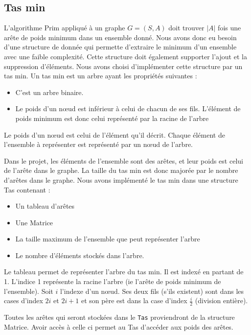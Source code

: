\documentclass[a4paper,11pt]{article}
\begin{document}
\subsection{Tas min} %
L'algorithme Prim appliqué à un graphe $G = (S, A)$ doit trouver $|A|$ fois une arête de poids minimum dans un ensemble donné.
Nous avons donc eu besoin d'une structure de donnée qui permette d'extraire le minimum d'un ensemble avec une faible complexité. Cette structure doit également supporter l'ajout et la suppression d'éléments.
Nous avons choisi d'implémenter cette structure par un tas min.
Un tas min est un arbre ayant les propriétés suivantes :
\begin{itemize}
\item C'est un arbre binaire.
\item Le poids d'un nœud est inférieur à celui de chacun de ses fils. L'élément de poids minimum est donc celui représenté par la racine de l'arbre
\end{itemize}
Le poids d'un nœud est celui de l'élément qu'il décrit.
Chaque élément de l'ensemble à représenter est représenté par un nœud de l'arbre.

Dans le projet, les éléments de l'ensemble sont des arêtes, et leur poids est celui de l'arête dans le graphe. La taille du tas min est donc majorée par le nombre d'arêtes dans le graphe.
Nous avons implémenté le tas min dans une structure \textsf{Tas} contenant :
\begin{itemize}
\renewcommand{\FrenchLabelItem}{\textbullet}
\item Un tableau d’arêtes
\item Une \textsf{Matrice}
\item La taille maximum de l'ensemble que peut représenter l'arbre
\item Le nombre d'éléments stockés dans l'arbre.
\end{itemize}
Le tableau permet de représenter l'arbre du tas min. Il est indexé en partant de 1.
L'indice 1 représente la racine l'arbre (ie l'arête de poids minimum de l'ensemble).
Soit $i$ l'indexe d'un nœud. Ses deux fils (s'ils existent) sont dans les cases d'index $2i$ et $2i +1$ et son père est dans la case d'index $\frac{i}{2}$ (division entière).

Toutes les arêtes qui seront stockées dans le \texttt{Tas} proviendront de la structure \textsf{Matrice}. Avoir accès à celle ci permet au \textsf{Tas} d'accéder aux poids des arêtes.
\end{document}
